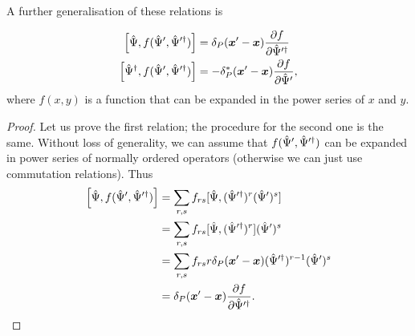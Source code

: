 A further generalisation of these relations is
\begin{lemma}
\label{lmm:formalism:func-aux:functional-commutators}
\begin{equation*}
\begin{split}
	\left[ \hat{\Psi}, f( \hat{\Psi}^\prime, \hat{\Psi}^{\prime\dagger} ) \right]
	& = \delta_P (\boldsymbol{x}^\prime - \boldsymbol{x}) \frac{\partial f}{\partial \hat{\Psi}^{\prime\dagger}} \\
	\left[ \hat{\Psi}^\dagger, f( \hat{\Psi}^\prime, \hat{\Psi}^{\prime\dagger} ) \right]
	& = -\delta_P^* (\boldsymbol{x}^\prime - \boldsymbol{x}) \frac{\partial f}{\partial \hat{\Psi}^\prime},
\end{split}
\end{equation*}
where $f(x, y)$ is a function that can be expanded in the power series of $x$ and $y$.
\end{lemma}
\begin{proof}
Let us prove the first relation; the procedure for the second one is the same.
Without loss of generality, we can assume that $f(\hat{\Psi}^\prime, \hat{\Psi}^{\prime\dagger})$ can be expanded in power series of normally ordered operators (otherwise we can just use commutation relations).
Thus
\begin{equation*}
\begin{split}
	\left[ \hat{\Psi}, f( \hat{\Psi}^\prime, \hat{\Psi}^{\prime\dagger} ) \right]
	& = \sum_{r,s} f_{rs} [ \hat{\Psi}, (\hat{\Psi}^{\prime\dagger})^r (\hat{\Psi}^\prime)^s ] \\
	& = \sum_{r,s} f_{rs} [ \hat{\Psi}, (\hat{\Psi}^{\prime\dagger})^r ] (\hat{\Psi}^\prime)^s \\
	& = \sum_{r,s} f_{rs} r \delta_P(\boldsymbol{x}^\prime - \boldsymbol{x})
		(\hat{\Psi}^{\prime\dagger})^{r-1} (\hat{\Psi}^\prime)^s \\
	& = \delta_P (\boldsymbol{x}^\prime - \boldsymbol{x}) \frac{\partial f}{\partial \hat{\Psi}^{\prime\dagger}}.
	\qedhere
\end{split}
\end{equation*}
\end{proof}
